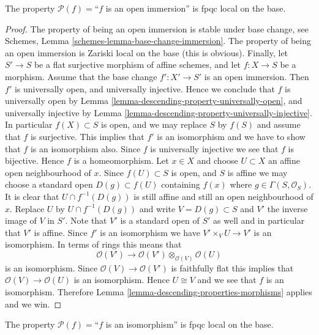 \begin{lemma}
\label{lemma-descending-property-open-immersion}
The property $\mathcal{P}(f) =$``$f$ is an open immersion''
is fpqc local on the base.
\end{lemma}

\begin{proof}
The property of being an open immersion is stable under base change,
see Schemes, Lemma \ref{schemes-lemma-base-change-immersion}.
The property of being an open immersion is Zariski local on the base
(this is obvious).
Finally, let
$S' \to S$ be a flat surjective morphism of affine schemes,
and let $f : X \to S$ be a morphism. Assume that the base change
$f' : X' \to S'$ is an open immersion.
Then $f'$ is universally open, and universally injective.
Hence we conclude that $f$ is universally open by
Lemma \ref{lemma-descending-property-universally-open}, and
universally injective by
Lemma \ref{lemma-descending-property-universally-injective}.
In particular $f(X) \subset S$ is open, and we may replace
$S$ by $f(S)$ and assume that $f$ is surjective.
This implies that $f'$ is an isomorphism and
we have to show that $f$ is an isomorphism also.
Since $f$ is universally injective we see that $f$ is bijective.
Hence $f$ is a homeomorphism. 
Let $x \in X$ and choose $U \subset X$ an
affine open neighbourhood of $x$. Since $f(U) \subset S$
is open, and $S$ is affine we may choose a standard open
$D(g) \subset f(U)$ containing $f(x)$ where $g \in \Gamma(S, \mathcal{O}_S)$.
It is clear that $U \cap f^{-1}(D(g))$ is still affine and still an
open neighbourhood of $x$.
Replace $U$ by $U \cap f^{-1}(D(g))$ and write $V = D(g) \subset S$
and $V'$ the inverse image of $V$ in $S'$.
Note that $V'$ is a standard open of $S'$ as well and
in particular that $V'$ is affine.
Since $f'$ is an isomorphism we have $V' \times_V U \to V'$ is
an isomorphism. In terms of rings this means that
$$
\mathcal{O}(V')
\longrightarrow
\mathcal{O}(V') \otimes_{\mathcal{O}(V)} \mathcal{O}(U)
$$
is an isomorphism. Since $\mathcal{O}(V) \to \mathcal{O}(V')$
is faithfully flat this implies that $\mathcal{O}(V) \to \mathcal{O}(U)$
is an isomorphism. Hence $U \cong V$ and we see that $f$ is
an isomorphism.
Therefore Lemma \ref{lemma-descending-properties-morphisms} applies and we win.
\end{proof}

\begin{lemma}
\label{lemma-descending-property-isomorphism}
The property $\mathcal{P}(f) =$``$f$ is an isomorphism''
is fpqc local on the base.
\end{lemma}

